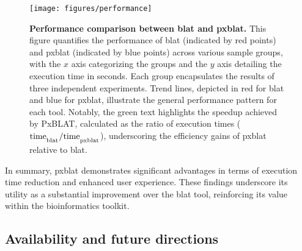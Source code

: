 \documentclass[10pt,letterpaper]{article}
\begin{document}
\begin{figure}[!h]
	\caption{{\bf Performance comparison between \gls{blat} and \gls{pxblat}.} This figure quantifies the performance of \gls{blat} (indicated by red points) and \gls{pxblat} (indicated by blue points) across various sample groups, with the \(x\) axis categorizing the groups and the \(y\) axis detailing the execution time in seconds.
        Each group encapsulates the results of three independent experiments.
        Trend lines, depicted in red for \gls{blat} and blue for \gls{pxblat}, illustrate the general performance pattern for each tool.
        Notably, the green text highlights the speedup achieved by PxBLAT, calculated as the ratio of execution times (\(\mathrm{time}_\textsubscript{blat} / \mathrm{time}_\textsubscript{pxblat}\)), underscoring the efficiency gains of \gls{pxblat} relative to \gls{blat}.}
	\texttt{[image: figures/performance]}
	\label{fig:performance}
\end{figure}

In summary, \gls{pxblat} demonstrates significant advantages in terms of execution time reduction and enhanced user experience.
These findings underscore its utility as a substantial improvement over the \gls{blat} tool, reinforcing its value within the bioinformatics toolkit.

\subsection*{Availability and future directions}
\end{document}
